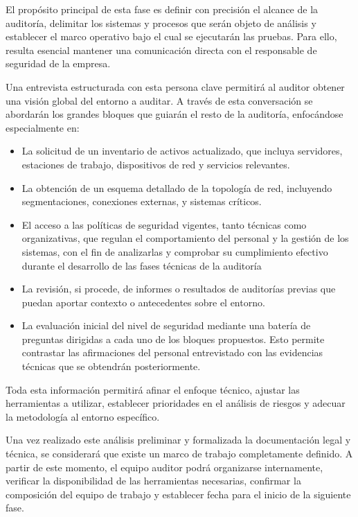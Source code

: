 \documentclass[a4paper, 11pt]{article}
\begin{document}
El propósito principal de esta fase es definir con precisión el alcance de la auditoría, delimitar los sistemas y procesos que serán objeto de análisis y establecer el marco operativo bajo el cual se ejecutarán las pruebas. Para ello, resulta esencial mantener una comunicación directa con el responsable de seguridad de la empresa.
\par\vspace{0.5cm}

Una entrevista estructurada con esta persona clave permitirá al auditor obtener una visión global del entorno a auditar. A través de esta conversación se abordarán los grandes bloques que guiarán el resto de la auditoría, enfocándose especialmente en:

\begin{itemize}
\item La solicitud de un inventario de activos actualizado, que incluya servidores, estaciones de trabajo, dispositivos de red y servicios relevantes.
\item La obtención de un esquema detallado de la topología de red, incluyendo segmentaciones, conexiones externas, y sistemas críticos.
\item El acceso a las políticas de seguridad vigentes, tanto técnicas como organizativas, que regulan el comportamiento del personal y la gestión de los sistemas, con el fin de analizarlas y comprobar su cumplimiento
efectivo durante el desarrollo de las fases técnicas de la auditoría
\item La revisión, si procede, de informes o resultados de auditorías previas que puedan aportar contexto o antecedentes sobre el entorno.
\item La evaluación inicial del nivel de seguridad mediante una batería de preguntas dirigidas a cada uno de los bloques propuestos. Esto permite contrastar las afirmaciones del personal entrevistado con las evidencias técnicas que se obtendrán posteriormente.
\end{itemize}

Toda esta información permitirá afinar el enfoque técnico, ajustar las herramientas a utilizar, establecer prioridades en el análisis de riesgos y adecuar la metodología al entorno específico.
\par\vspace{0.5cm}

Una vez realizado este análisis preliminar y formalizada la documentación legal y técnica, se considerará que existe un marco de trabajo completamente definido. A partir de este momento, el equipo auditor podrá organizarse internamente, verificar la disponibilidad de las herramientas necesarias, confirmar la composición del equipo de trabajo y establecer fecha para el inicio de la siguiente fase.
\par\vspace{0.5cm}
\end{document}

